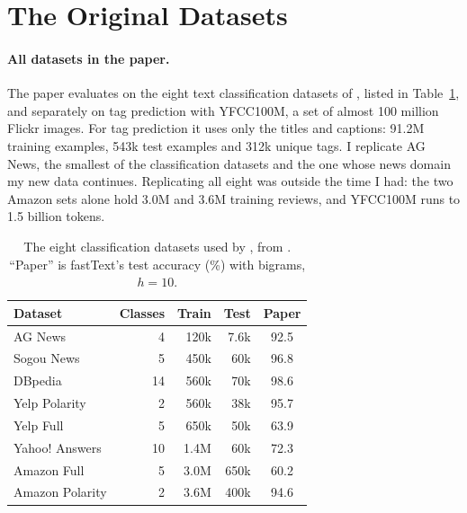 \documentclass[11pt]{article}
\begin{document}
\section{The Original Datasets}

\paragraph{All datasets in the paper.} The paper evaluates on the eight text classification
datasets of \citet{zhang2015character}, listed in Table~\ref{tab:datasets}, and separately on
tag prediction with YFCC100M, a set of almost 100 million Flickr images. For tag prediction
it uses only the titles and captions: 91.2M training examples, 543k test examples and
312k unique tags. I replicate AG News, the smallest of the classification datasets and the
one whose news domain my new data continues. Replicating all eight was outside the time I
had: the two Amazon sets alone hold 3.0M and 3.6M training reviews, and YFCC100M runs to 1.5 billion
tokens.

\begin{table}[t]
\centering\small
\begin{tabular}{@{}lrrrc@{}}
\toprule
Dataset & Classes & Train & Test & Paper \\
\midrule
AG News & 4 & 120k & 7.6k & 92.5 \\
Sogou News & 5 & 450k & 60k & 96.8 \\
DBpedia & 14 & 560k & 70k & 98.6 \\
Yelp Polarity & 2 & 560k & 38k & 95.7 \\
Yelp Full & 5 & 650k & 50k & 63.9 \\
Yahoo! Answers & 10 & 1.4M & 60k & 72.3 \\
Amazon Full & 5 & 3.0M & 650k & 60.2 \\
Amazon Polarity & 2 & 3.6M & 400k & 94.6 \\
\bottomrule
\end{tabular}
\caption{The eight classification datasets used by \citet{joulin-etal-2017-bag}, from
\citet{zhang2015character}. ``Paper'' is fastText's test accuracy (\%) with bigrams,
$h=10$.}
\label{tab:datasets}
\end{table}
\end{document}
